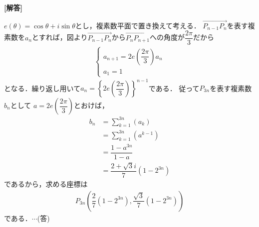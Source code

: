 \documentclass[../../main.tex]{subfiles}
\begin{document}
\begin{oframed}
  
\end{oframed}

{\bf [解答]}

$e(\theta)=\cos\theta+i\sin\theta$とし，複素数平面で置き換えて考える．
$\overrightarrow{P_{n-1}P_n}$を表す複素数を$a_n$とすれば，図より$\overrightarrow{P_{n-1}P_n}$から$\overrightarrow{P_{n}P_{n+1}}$への角度が$\dfrac{2\pi}{3}$だから
\begin{align}
  \begin{cases}
    a_{n+1}=2e\left(\dfrac{2\pi}{3}\right)a_n  \\
    a_1=1
  \end{cases}
\end{align}
となる．繰り返し用いて$a_n=\left\{2e\left(\dfrac{2\pi}{3}\right)\right\}^{n-1}$である．
従って$P_{3n}$を表す複素数$b_{n}$として
$a=2e\left(\dfrac{2\pi}{3}\right)$とおけば，
\begin{align}
  b_n&=\sum_{k=1}^{3n}(a_k) \\
  &=\sum_{k=1}^{3n}(a^{k-1}) \\
  &=\dfrac{1-a^{3n}}{1-a} \\
  &=\dfrac{2+\sqrt{3}i}{7}(1-2^{3n})
\end{align}
であるから，求める座標は
\begin{align}
  P_{3n}\left(\dfrac{2}{7}(1-2^{3n}),\dfrac{\sqrt{3}}{7}(1-2^{3n})\right)
\end{align}
である．$\cdots$(答)

\newpage
\end{document}
